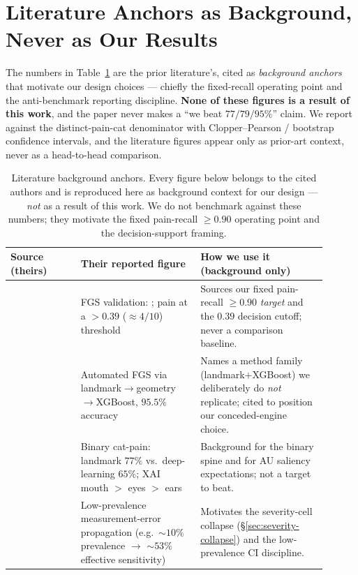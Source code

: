 \section{Literature Anchors as Background, Never as Our Results}
\label{sec:lit-anchors}

The numbers in Table~\ref{tab:lit-anchors} are the prior literature's, cited as
\emph{background anchors} that motivate our design choices --- chiefly the
fixed-recall operating point and the anti-benchmark reporting discipline. \textbf{None
of these figures is a result of this work}, and the paper never makes a
``we beat $77/79/95\%$'' claim. We report against the distinct-pain-cat
denominator with Clopper--Pearson / bootstrap confidence intervals, and the
literature figures appear only as prior-art context, never as a head-to-head
comparison.

\begin{table}[t]
\centering
\caption[Literature background anchors]{Literature background anchors. Every figure
below belongs to the cited authors and is reproduced here as background context for
our design --- \emph{not} as a result of this work. We do not benchmark against
these numbers; they motivate the fixed pain-recall $\geq 0.90$ operating point and
the decision-support framing.}
\label{tab:lit-anchors}
\footnotesize
\begin{tabular}{@{}p{0.20\linewidth}p{0.34\linewidth}p{0.36\linewidth}@{}}
\toprule
Source (theirs) & Their reported figure & How we use it (background only) \\
\midrule
\citet{evangelista2019} &
  FGS validation: \evangelistanums{}; pain at a $>0.39$ ($\approx 4/10$) threshold &
  Sources our fixed pain-recall $\geq 0.90$ \emph{target} and the $0.39$ decision
  cutoff; never a comparison baseline. \\[2pt]
\citet{steagall2023} &
  Automated FGS via landmark$\to$geometry$\to$XGBoost, $95.5\%$ accuracy &
  Names a method family (landmark$+$XGBoost) we deliberately do \emph{not}
  replicate; cited to position our conceded-engine choice. \\[2pt]
\citet{feighelstein2023} &
  Binary cat-pain: landmark $77\%$ vs.\ deep-learning $65\%$; XAI mouth $>$ eyes
  $>$ ears &
  Background for the binary spine and for AU saliency expectations; not a target
  to beat. \\[2pt]
\citet{chavoshi2025} &
  Low-prevalence measurement-error propagation (e.g.\ ${\sim}10\%$ prevalence
  $\to$ ${\sim}53\%$ effective sensitivity) &
  Motivates the severity-cell collapse (\S\ref{sec:severity-collapse}) and the
  low-prevalence CI discipline. \\
\bottomrule
\end{tabular}
\end{table}

